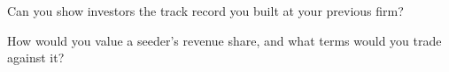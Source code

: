 \begin{interviewq}\label{iq:fm:launching-a-fund-and-raising-capital:5}
Can you show investors the track record you built at your previous firm?
\end{interviewq}

\begin{interviewq}\label{iq:fm:launching-a-fund-and-raising-capital:6}
How would you value a seeder's revenue share, and what terms would you trade against it?
\end{interviewq}
